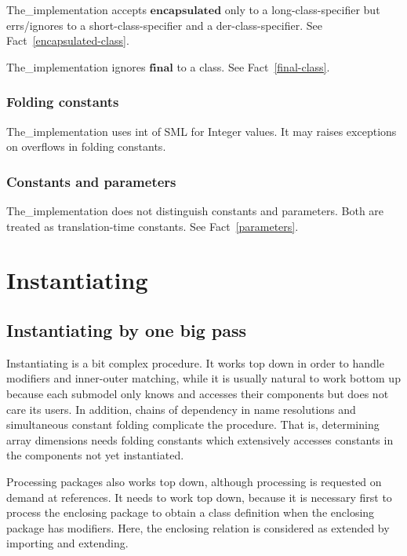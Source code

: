 \documentclass[10pt,b5paper]{article}
\begin{document}
The_implementation accepts $\mathbf{encapsulated}$ only to a
long-class-specifier but errs/ignores to a short-class-specifier and a
der-class-specifier.  See Fact~\ref{encapsulated-class}.

The_implementation ignores $\mathbf{final}$ to a class.  See
Fact~\ref{final-class}.

\subsubsection*{Folding constants}

The_implementation uses int of SML for Integer values.  It may raises
exceptions on overflows in folding constants.

\subsubsection*{Constants and parameters}

The_implementation does not distinguish constants and parameters.
Both are treated as translation-time constants.  See
Fact~\ref{parameters}.


\section{Instantiating}


\subsection{Instantiating by one big pass}

{Instantiating} is a bit complex procedure.  It works top down in
order to handle modifiers and inner-outer matching, while it is
usually natural to work bottom up because each submodel only knows and
accesses their components but does not care its users.  In addition,
chains of dependency in name resolutions and simultaneous constant
folding complicate the procedure.  That is, determining array
dimensions needs folding constants which extensively accesses
constants in the components not yet instantiated.

Processing packages also works top down, although processing is
requested on demand at references.  It needs to work top down, because
it is necessary first to process the enclosing package to obtain a
class definition when the enclosing package has modifiers.  Here, the
enclosing relation is considered as extended by importing and
extending.
\end{document}
